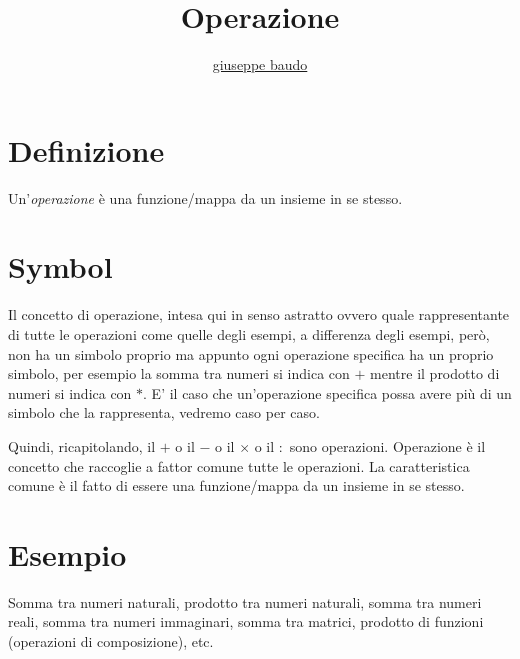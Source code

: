 \documentclass[a4paper,10pt]{article}
\title{Operazione}
\author{\href{http://www.baudo.hol.es}{giuseppe baudo}}
\begin{document}
\maketitle

\section{Definizione}
Un'\textit{operazione} è una funzione/mappa da un insieme in se stesso. 

\section{Symbol}
Il concetto di operazione, intesa qui in senso astratto ovvero quale rappresentante di tutte le operazioni come quelle degli esempi, a differenza degli esempi, però, non ha un simbolo proprio ma appunto
ogni operazione specifica ha un proprio simbolo, per esempio la somma tra numeri si indica con $+$ mentre il prodotto di numeri si indica con $*$. E' il caso che un'operazione
specifica possa avere più di un simbolo che la rappresenta, vedremo caso per caso.

Quindi, ricapitolando, il $+$ o il $-$ o il $\times$ o il $:$ sono operazioni. Operazione è il concetto che raccoglie a fattor comune tutte le operazioni. La caratteristica comune
è il fatto di essere una funzione/mappa da un insieme in se stesso.

\section{Esempio}
Somma tra numeri naturali, prodotto tra numeri naturali, somma tra numeri reali, somma tra numeri immaginari, somma tra matrici, prodotto di funzioni (operazioni di composizione), etc.
\end{document}
